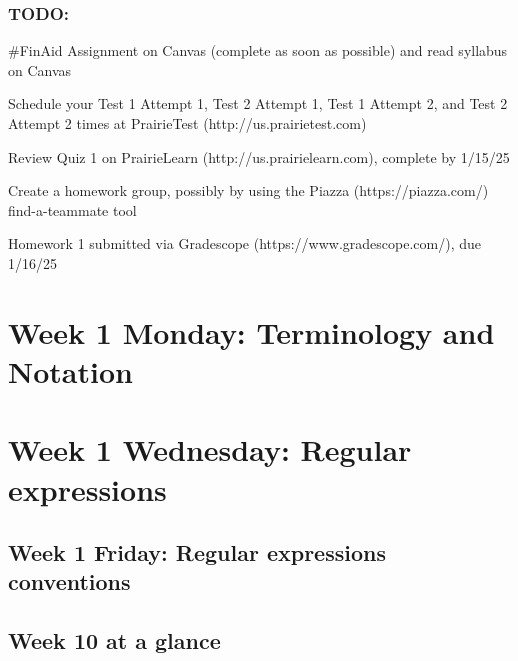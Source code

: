 \subsubsection*{TODO:}
\begin{list}{\itemsep-10pt}
   \item \#FinAid Assignment on Canvas (complete as soon as possible) and read syllabus on Canvas
   \item Schedule your Test 1 Attempt 1, Test 2 Attempt 1, Test 1 Attempt 2, and Test 2 Attempt 2 times 
   at PrairieTest (http://us.prairietest.com)
   \item Review Quiz 1 on PrairieLearn (http://us.prairielearn.com), complete by 1/15/25
   \item Create a homework group, possibly by using the Piazza (https://piazza.com/) find-a-teammate tool
   \item Homework 1 submitted via Gradescope (https://www.gradescope.com/), due 1/16/25
\end{list}

\newpage

\section*{Week 1 Monday: Terminology and Notation}


    
\newpage

\section*{Week 1 Wednesday: Regular expressions}


    
\newpage

\subsection*{Week 1 Friday: Regular expressions conventions}





\newpage

\subsection*{Week 10 at a glance}

\vspace{-20pt}

